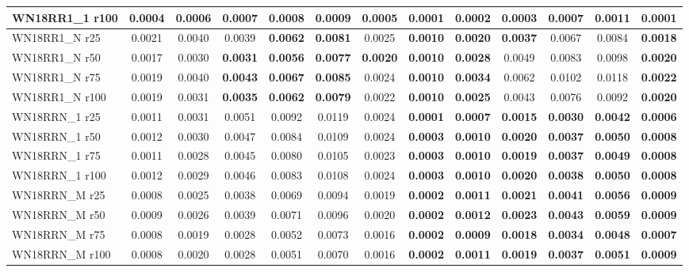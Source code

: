 \begin{table}[t]
{\begin{tabular}{l||cccccc||cccccc}
WN18RR1\_1 r100 & 0.0004 & 0.0006 & 0.0007 & 0.0008 & \textbf{0.0009} & 0.0005 & \textbf{0.0001} & \textbf{0.0002} & \textbf{0.0003} & \textbf{0.0007} & 0.0011 & \textbf{0.0001} \\
\hline
WN18RR1\_N r25 & 0.0021 & 0.0040 & 0.0039 & \textbf{0.0062} & \textbf{0.0081} & 0.0025 & \textbf{0.0010} & \textbf{0.0020} & \textbf{0.0037} & 0.0067 & 0.0084 & \textbf{0.0018} \\
WN18RR1\_N r50 & 0.0017 & 0.0030 & \textbf{0.0031} & \textbf{0.0056} & \textbf{0.0077} & \textbf{0.0020} & \textbf{0.0010} & \textbf{0.0028} & 0.0049 & 0.0083 & 0.0098 & \textbf{0.0020} \\
WN18RR1\_N r75 & 0.0019 & 0.0040 & \textbf{0.0043} & \textbf{0.0067} & \textbf{0.0085} & 0.0024 & \textbf{0.0010} & \textbf{0.0034} & 0.0062 & 0.0102 & 0.0118 & \textbf{0.0022} \\
WN18RR1\_N r100 & 0.0019 & 0.0031 & \textbf{0.0035} & \textbf{0.0062} & \textbf{0.0079} & 0.0022 & \textbf{0.0010} & \textbf{0.0025} & 0.0043 & 0.0076 & 0.0092 & \textbf{0.0020} \\
\hline
WN18RRN\_1 r25 & 0.0011 & 0.0031 & 0.0051 & 0.0092 & 0.0119 & 0.0024 & \textbf{0.0001} & \textbf{0.0007} & \textbf{0.0015} & \textbf{0.0030} & \textbf{0.0042} & \textbf{0.0006} \\
WN18RRN\_1 r50 & 0.0012 & 0.0030 & 0.0047 & 0.0084 & 0.0109 & 0.0024 & \textbf{0.0003} & \textbf{0.0010} & \textbf{0.0020} & \textbf{0.0037} & \textbf{0.0050} & \textbf{0.0008} \\
WN18RRN\_1 r75 & 0.0011 & 0.0028 & 0.0045 & 0.0080 & 0.0105 & 0.0023 & \textbf{0.0003} & \textbf{0.0010} & \textbf{0.0019} & \textbf{0.0037} & \textbf{0.0049} & \textbf{0.0008} \\
WN18RRN\_1 r100 & 0.0012 & 0.0029 & 0.0046 & 0.0083 & 0.0108 & 0.0024 & \textbf{0.0003} & \textbf{0.0010} & \textbf{0.0020} & \textbf{0.0038} & \textbf{0.0050} & \textbf{0.0008} \\
\hline
WN18RRN\_M r25 & 0.0008 & 0.0025 & 0.0038 & 0.0069 & 0.0094 & 0.0019 & \textbf{0.0002} & \textbf{0.0011} & \textbf{0.0021} & \textbf{0.0041} & \textbf{0.0056} & \textbf{0.0009} \\
WN18RRN\_M r50 & 0.0009 & 0.0026 & 0.0039 & 0.0071 & 0.0096 & 0.0020 & \textbf{0.0002} & \textbf{0.0012} & \textbf{0.0023} & \textbf{0.0043} & \textbf{0.0059} & \textbf{0.0009} \\
WN18RRN\_M r75 & 0.0008 & 0.0019 & 0.0028 & 0.0052 & 0.0073 & 0.0016 & \textbf{0.0002} & \textbf{0.0009} & \textbf{0.0018} & \textbf{0.0034} & \textbf{0.0048} & \textbf{0.0007} \\
WN18RRN\_M r100 & 0.0008 & 0.0020 & 0.0028 & 0.0051 & 0.0070 & 0.0016 & \textbf{0.0002} & \textbf{0.0011} & \textbf{0.0019} & \textbf{0.0037} & \textbf{0.0051} & \textbf{0.0009} \\
\hline
\end{tabular}%
}
\end{table}
